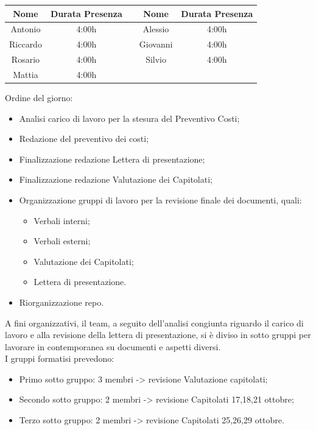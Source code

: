 \documentclass[12pt,a4paper]{article}
\begin{document}
\begin{center}
    \begin{tabular}{ |c|c|c|c|c| }
        \hline
        Nome     & Durata Presenza &  & Nome     & Durata Presenza \\
        \hline
        Antonio  & 4:00h           &  & Alessio  & 4:00h           \\
        \hline
        Riccardo & 4:00h           &  & Giovanni & 4:00h           \\
        \hline
        Rosario  & 4:00h           &  & Silvio   & 4:00h           \\
        \hline
        Mattia   & 4:00h           &  &          &                 \\
        \hline
    \end{tabular}
\end{center}
\newpage

Ordine del giorno:
\begin{itemize}
    \item Analisi carico di lavoro per la stesura del Preventivo Costi;
    \item Redazione del preventivo dei costi;
    \item Finalizzazione redazione Lettera di presentazione;
    \item Finalizzazione redazione Valutazione dei Capitolati;
    \item Organizzazione gruppi di lavoro per la revisione finale dei documenti, quali:
        \begin{itemize}
            \item Verbali interni;
            \item Verbali esterni;
            \item Valutazione dei Capitolati;
            \item Lettera di presentazione.
        \end{itemize}
    \item Riorganizzazione repo.
\end{itemize}

A fini organizzativi, il team, a seguito dell'analisi congiunta riguardo il carico di lavoro e alla revisione della lettera di presentazione, si è diviso in sotto gruppi per lavorare in contemporanea su documenti e aspetti diversi.\\
I gruppi formatisi prevedono:
\begin{itemize}
    \item Primo sotto gruppo: 3 membri -> revisione Valutazione capitolati;
    \item Secondo sotto gruppo: 2 membri -> revisione Capitolati 17,18,21 ottobre;
    \item Terzo sotto gruppo: 2 membri -> revisione Capitolati 25,26,29 ottobre.
\end{itemize}
\end{document}
